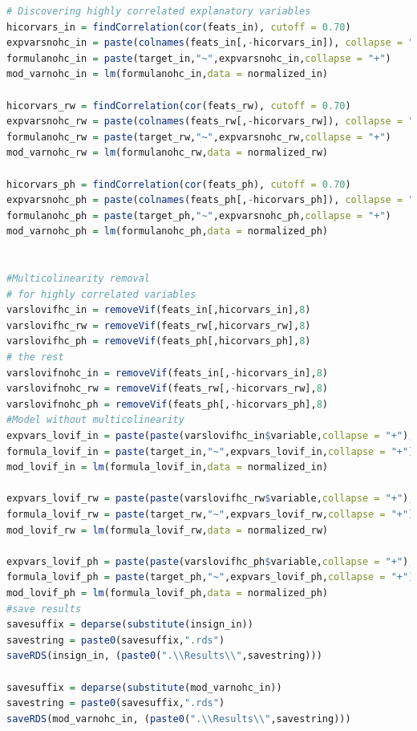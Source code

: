 \documentclass[11pt]{article}
\begin{document}
\begin{lstlisting}[language= R]
# Discovering highly correlated explanatory variables
hicorvars_in = findCorrelation(cor(feats_in), cutoff = 0.70)
expvarsnohc_in = paste(colnames(feats_in[,-hicorvars_in]), collapse = "+")
formulanohc_in = paste(target_in,"~",expvarsnohc_in,collapse = "+")
mod_varnohc_in = lm(formulanohc_in,data = normalized_in)

hicorvars_rw = findCorrelation(cor(feats_rw), cutoff = 0.70)
expvarsnohc_rw = paste(colnames(feats_rw[,-hicorvars_rw]), collapse = "+")
formulanohc_rw = paste(target_rw,"~",expvarsnohc_rw,collapse = "+")
mod_varnohc_rw = lm(formulanohc_rw,data = normalized_rw)

hicorvars_ph = findCorrelation(cor(feats_ph), cutoff = 0.70)
expvarsnohc_ph = paste(colnames(feats_ph[,-hicorvars_ph]), collapse = "+")
formulanohc_ph = paste(target_ph,"~",expvarsnohc_ph,collapse = "+")
mod_varnohc_ph = lm(formulanohc_ph,data = normalized_ph)


#Multicolinearity removal 
# for highly correlated variables
varslovifhc_in = removeVif(feats_in[,hicorvars_in],8) 
varslovifhc_rw = removeVif(feats_rw[,hicorvars_rw],8) 
varslovifhc_ph = removeVif(feats_ph[,hicorvars_ph],8) 
# the rest
varslovifnohc_in = removeVif(feats_in[,-hicorvars_in],8) 
varslovifnohc_rw = removeVif(feats_rw[,-hicorvars_rw],8) 
varslovifnohc_ph = removeVif(feats_ph[,-hicorvars_ph],8) 
#Model without multicolinearity
expvars_lovif_in = paste(paste(varslovifhc_in$variable,collapse = "+"),"+",paste(varslovifnohc_in$variable,collapse = "+"),collapse = "+")
formula_lovif_in = paste(target_in,"~",expvars_lovif_in,collapse = "+")
mod_lovif_in = lm(formula_lovif_in,data = normalized_in)

expvars_lovif_rw = paste(paste(varslovifhc_rw$variable,collapse = "+"),"+",paste(varslovifnohc_rw$variable,collapse = "+"),collapse = "+")
formula_lovif_rw = paste(target_rw,"~",expvars_lovif_rw,collapse = "+")
mod_lovif_rw = lm(formula_lovif_rw,data = normalized_rw)

expvars_lovif_ph = paste(paste(varslovifhc_ph$variable,collapse = "+"),"+",paste(varslovifnohc_ph$variable,collapse = "+"),collapse = "+")
formula_lovif_ph = paste(target_ph,"~",expvars_lovif_ph,collapse = "+")
mod_lovif_ph = lm(formula_lovif_ph,data = normalized_ph)
#save results
savesuffix = deparse(substitute(insign_in))
savestring = paste0(savesuffix,".rds")
saveRDS(insign_in, (paste0(".\\Results\\",savestring)))

savesuffix = deparse(substitute(mod_varnohc_in))
savestring = paste0(savesuffix,".rds")
saveRDS(mod_varnohc_in, (paste0(".\\Results\\",savestring)))


\end{lstlisting}
\end{document}
